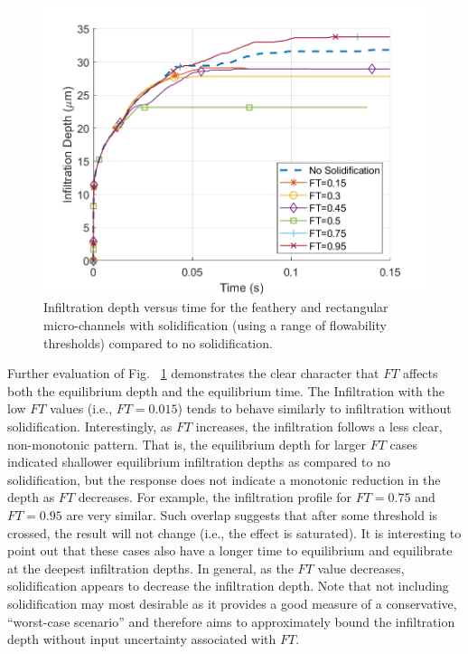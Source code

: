 \documentclass[%
 aip,
 amsmath,amssymb,
 reprint,%
]{revtex4-1}
\begin{document}
\begin{figure}[htp!]
    \centering
    \includegraphics[width=\linewidth]{Figures/solidificationStudy.png}
    \caption{Infiltration depth versus time for the feathery and rectangular micro-channels with solidification (using a range of flowability thresholds) compared to no solidification.}
    \label{fig:solidification}
\end{figure}

Further evaluation of Fig. ~\ref{fig:solidification} demonstrates the clear character that $FT$ affects both the equilibrium depth and the equilibrium time. 
The Infiltration with the low $FT$ values (i.e., $FT=0.015$) tends to behave similarly to infiltration without solidification. 
Interestingly, as $FT$ increases, the infiltration follows a less clear, non-monotonic pattern. 
That is, the equilibrium depth for larger $FT$ cases indicated 
shallower equilibrium infiltration depths as compared to no solidification, but the response does not indicate a monotonic reduction in the depth as $FT$ decreases. 
For example, the infiltration profile for $FT=0.75$ and $FT=0.95$ are very similar.
Such overlap suggests that after some threshold is crossed, the result will not change (i.e., the effect is saturated). 
It is interesting to point out that these cases also have a longer time to equilibrium and equilibrate at the deepest infiltration depths. 
In general, as the $FT$ value decreases, solidification appears to decrease the infiltration depth. 
Note that not including solidification may most desirable as it provides a good measure of a conservative, ``worst-case scenario'' and therefore aims to approximately bound the infiltration depth without input uncertainty associated with $FT$.
\end{document}
